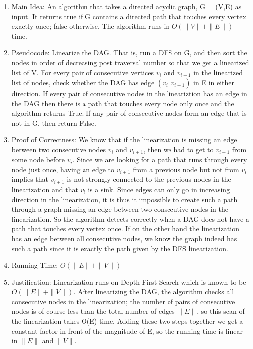 \documentclass[11pt]{article}
\begin{document}
\begin{enumerate}
\item Main Idea: An algorithm that takes a directed acyclic graph, G = (V,E) as input. It returns true if G contains a directed path that touches every vertex exactly once; false otherwise. The algorithm runs in $O(\|V\|+\|E\|)$ time.
\item Pseudocode: Linearize the DAG. That is, run a DFS on G, and then sort the nodes in order of decreasing post traversal number so that we get a linearized list of {V}. For every pair of consecutive vertices $v_i$ and $v_{i+1}$ in the linearized list of nodes, check whether the DAG has edge $(v_i,v_{i+1})$ in {E} in either direction. If every pair of consecutive nodes in the lineariztion has an edge in the DAG then there is a path that touches every node only once and the algorithm returns True. If any pair of consecutive nodes form an edge that is not in G, then return False.
\item Proof of Correctness: We know that if the linearization is missing an edge between two consecutive nodes $v_i$ and $v_{i+1}$, then we had to get to $v_{i+1}$ from some node before $v_i$. Since we are looking for a path that runs through every node just once, having an edge to $v_{i+1}$ from a previous node but not from $v_i$ implies that $v_{i+1}$ is not strongly connected to the previous nodes in the linearization and that $v_i$ is a sink. Since edges can only go in increasing direction in the linearization, it is thus it impossible to create such a path through a graph missing an edge between two consecutive nodes in the linearization. So the algorithm detects correctly when a DAG does not have a path that touches every vertex once. If on the other hand the linearization has an edge between all consecutive nodes, we know the graph indeed has such a path since it is exactly the path given by the DFS linearization.
\item Running Time: $O(\|E\|+\|V\|)$
\item Justification: Linearization runs on Depth-First Search which is known to be $O(\|E\|+\|V\|)$. After linearizing the DAG, the algorithm checks all consecutive nodes in the linearization; the number of pairs of consecutive nodes is of course less than the total number of edges $\|E\|$, so this scan of the linearization takes O(E) time. Adding these two steps together we get a constant factor in front of the magnitude of E, so the running time is linear in $\|E\|$ and $\|V\|$.
\end{enumerate}
\end{document}
